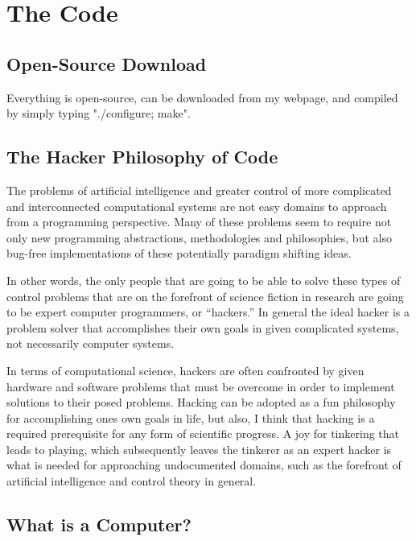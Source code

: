 \chapter{The Code}\label{appendix:the_code}

\section{Open-Source Download}

Everything is open-source, can be downloaded from my webpage, and
compiled by simply typing "./configure; make".

\section{The Hacker Philosophy of Code}

The problems of artificial intelligence and greater control of more
complicated and interconnected computational systems are not easy
domains to approach from a programming perspective.  Many of these
problems seem to require not only new programming abstractions,
methodologies and philosophies, but also bug-free implementations of
these potentially paradigm shifting ideas.

In other words, the only people that are going to be able to solve
these types of control problems that are on the forefront of science
fiction in research are going to be expert computer programmers, or
``hackers.''  In general the ideal hacker is a problem solver that
accomplishes their own goals in given complicated systems, not
necessarily computer systems.

In terms of computational science, hackers are often confronted by
given hardware and software problems that must be overcome in order to
implement solutions to their posed problems.  Hacking can be adopted
as a fun philosophy for accomplishing ones own goals in life, but
also, I think that hacking is a required prerequisite for any form of
scientific progress.  A joy for tinkering that leads to playing, which
subsequently leaves the tinkerer as an expert hacker is what is needed
for approaching undocumented domains, such as the forefront of
artificial intelligence and control theory in general.

\section{What is a Computer?}
\label{sec:what_is_a_computer}


